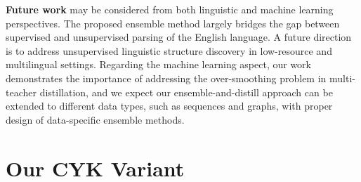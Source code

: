 \documentclass{article}
\begin{document}
\textbf{Future work} may be considered from both linguistic and machine learning perspectives. The proposed ensemble method largely bridges the gap between supervised and unsupervised parsing of the English language. A future direction is to address unsupervised linguistic structure discovery in low-resource and multilingual settings. Regarding the machine learning aspect, our work demonstrates the importance of addressing the over-smoothing problem in multi-teacher distillation, and we expect our ensemble-and-distill approach can be extended to different data types, such as sequences and graphs, with proper design of data-specific ensemble methods.

\newpage




\newpage

\appendix
\section{Our CYK Variant}
\label{apdx:CYKalgo}
\end{document}
